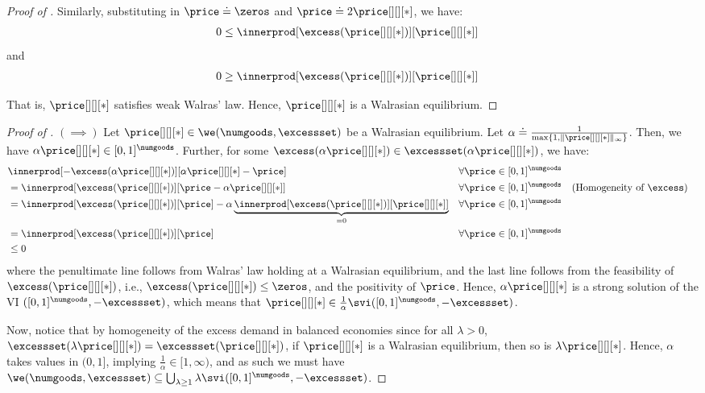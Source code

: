 \begin{proof}[Proof of ]
    Similarly, substituting in $\price \doteq \zeros$ and $\price \doteq 2\price[][][*]$, we have:
    \begin{align*}
        0&\leq  \innerprod[{\excess(\price[][][*])}][{\price[][][*]}] 
    \end{align*}
    and 
    \begin{align}
        0&\geq  \innerprod[{\excess(\price[][][*])}][{\price[][][*]}] 
    \end{align}

    That is, $\price[][][*]$ satisfies weak Walras' law.
    Hence, $\price[][][*]$ is a Walrasian equilibrium.
\end{proof}


\thmwebalancedequalsvi*
\begin{proof}[Proof of ]
    $(\implies)$
    Let $\price[][][*] \in \we(\numgoods, \excessset)$ be a Walrasian equilibrium. Let $\alpha \doteq \frac{1}{\max\{1, \|\price[][][*]\|_\infty \}}$. Then, we have $\alpha \price[][][*] \in [0, 1]^\numgoods$. Further, for some $\excess(\alpha \price[][][*]) \in \excessset(\alpha \price[][][*])$, we have:
    \begin{align*}
        &\innerprod[{-\excess(\alpha\price[][][*])}][{\alpha\price[][][*] - \price}] && \forall \price \in [0, 1]^\numgoods\\
        &= \innerprod[{\excess(\price[][][*])}][{\price - \alpha\price[][][*]}] && \forall \price \in [0, 1]^\numgoods && \text{(Homogeneity of $\excess$)}\\
        &= \innerprod[{\excess(\price[][][*])}][{\price}] - \alpha \underbrace{\innerprod[{\excess(\price[][][*])}][{\price[][][*] }]}_{= 0} && \forall \price \in [0, 1]^\numgoods\\
        &= \innerprod[{\excess(\price[][][*])}][{\price}]  && \forall \price \in [0, 1]^\numgoods\\
        &\leq 0
    \end{align*}
    where the penultimate line follows from Walras' law holding at a Walrasian equilibrium, and the last line follows from the feasibility of $\excess(\price[][][*])$, i.e., $\excess(\price[][][*]) \leq \zeros$, and the positivity of $\price$. Hence, $\alpha \price[][][*]$ is a strong solution of the VI $([0, 1]^\numgoods, - \excessset)$, which means that $\price[][][*] \in \frac{1}{\alpha} \svi([0, 1]^\numgoods, - \excessset)$.
    
    Now, notice that by homogeneity of the excess demand in balanced economies since for all $\lambda > 0$, $\excessset(\lambda \price[][][*]) = \excessset(\price[][][*])$, if $\price[][][*]$ is a Walrasian equilibrium, then so is $\lambda \price[][][*]$. Hence, $\alpha$ takes values in $(0, 1]$, implying $\frac{1}{\alpha} \in [1, \infty)$, and as such we must have $\we(\numgoods, \excessset) \subseteq  \bigcup_{\lambda \geq 1} \lambda \svi([0, 1]^\numgoods, -\excessset)$.
    

\end{proof}
